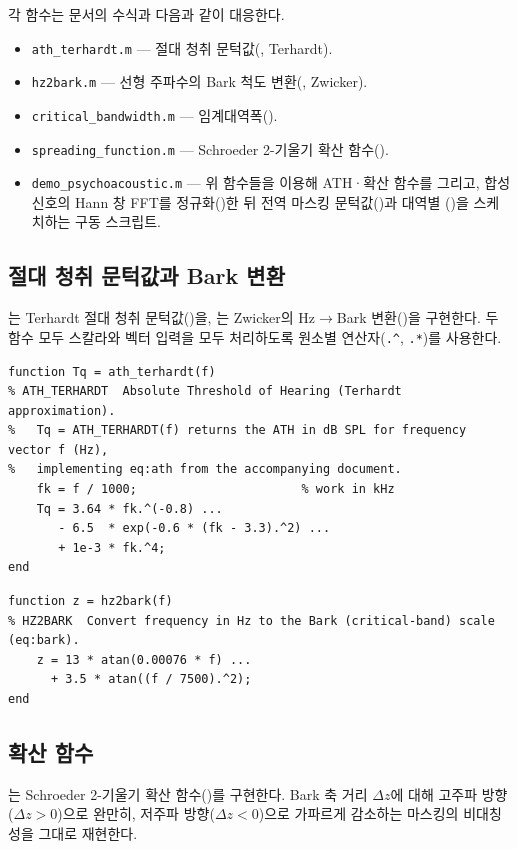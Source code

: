 \documentclass[11pt,a4paper]{article}
\newcommand{\dBSPL}{\ensuremath{\,\mathrm{dB\,SPL}}}  %
\newcommand{\SMR}{\mathrm{SMR}}                        %
\newcommand{\dz}{\Delta z}                             %
\begin{document}
각 함수는 문서의 수식과 다음과 같이 대응한다.
\begin{itemize}
  \item \texttt{ath\_terhardt.m} --- 절대 청취 문턱값(, Terhardt).
  \item \texttt{hz2bark.m} --- 선형 주파수의 Bark 척도 변환(, Zwicker).
  \item \texttt{critical\_bandwidth.m} --- 임계대역폭().
  \item \texttt{spreading\_function.m} --- Schroeder 2-기울기 확산 함수().
  \item \texttt{demo\_psychoacoustic.m} --- 위 함수들을 이용해 ATH·확산 함수를
        그리고, 합성 신호의 Hann 창 FFT를  정규화()한 뒤
        전역 마스킹 문턱값()과 대역별 \SMR()을
        스케치하는 구동 스크립트.
\end{itemize}

\subsection{절대 청취 문턱값과 Bark 변환}
는 Terhardt 절대 청취 문턱값()을, 는
Zwicker의 Hz$\to$Bark 변환()을 구현한다. 두 함수 모두 스칼라와 벡터
입력을 모두 처리하도록 원소별 연산자(\texttt{.\^{}}, \texttt{.*})를 사용한다.

\begin{lstlisting}[caption={ath\_terhardt.m --- Absolute Threshold of Hearing (eq:ath)},label={lst:ath}]
function Tq = ath_terhardt(f)
% ATH_TERHARDT  Absolute Threshold of Hearing (Terhardt approximation).
%   Tq = ATH_TERHARDT(f) returns the ATH in dB SPL for frequency vector f (Hz),
%   implementing eq:ath from the accompanying document.
    fk = f / 1000;                       % work in kHz
    Tq = 3.64 * fk.^(-0.8) ...
       - 6.5  * exp(-0.6 * (fk - 3.3).^2) ...
       + 1e-3 * fk.^4;
end
\end{lstlisting}

\begin{lstlisting}[caption={hz2bark.m --- Hz to Bark scale conversion (eq:bark)},label={lst:bark}]
function z = hz2bark(f)
% HZ2BARK  Convert frequency in Hz to the Bark (critical-band) scale (eq:bark).
    z = 13 * atan(0.00076 * f) ...
      + 3.5 * atan((f / 7500).^2);
end
\end{lstlisting}

\subsection{확산 함수}
는 Schroeder 2-기울기 확산 함수()를 구현한다.
Bark 축 거리 $\dz$에 대해 고주파 방향($\dz>0$)으로 완만히, 저주파 방향($\dz<0$)으로
가파르게 감소하는 마스킹의 비대칭성을 그대로 재현한다.
\end{document}
